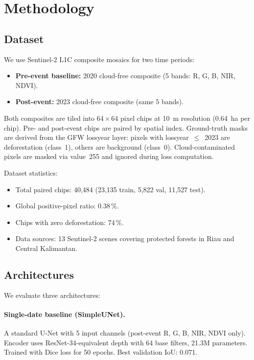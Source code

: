 \documentclass[10pt,a4paper,onecolumn]{article}
\begin{document}
\section{Methodology}

\subsection{Dataset}
We use Sentinel-2 L1C composite mosaics for two time periods:
\begin{itemize}[nosep]
    \item \textbf{Pre-event baseline:} 2020 cloud-free composite
          (5 bands: R, G, B, NIR, NDVI).
    \item \textbf{Post-event:} 2023 cloud-free composite
          (same 5 bands).
\end{itemize}
Both composites are tiled into $64\times64$ pixel chips at 10~m
resolution (0.64~ha per chip).  Pre- and post-event chips are paired
by spatial index.  Ground-truth masks are derived from the GFW
lossyear layer: pixels with lossyear~$\leq$~2023 are deforestation
(class~1), others are background (class~0).  Cloud-contaminated
pixels are masked via value~255 and ignored during loss computation.

Dataset statistics:
\begin{itemize}[nosep]
    \item Total paired chips: 40,484 (23,135 train, 5,822 val, 11,527 test).
    \item Global positive-pixel ratio: 0.38\,\%.
    \item Chips with zero deforestation: 74\,\%.
    \item Data sources: 13 Sentinel-2 scenes covering protected
          forests in Riau and Central Kalimantan.
\end{itemize}

\subsection{Architectures}

We evaluate three architectures:

\paragraph{Single-date baseline (SimpleUNet).}
A standard U-Net with 5 input channels (post-event R, G, B, NIR, NDVI
only).  Encoder uses ResNet-34-equivalent depth with 64 base filters,
21.3M parameters.  Trained with Dice loss for 50 epochs.  Best
validation IoU: 0.071.
\end{document}
